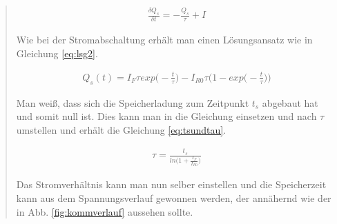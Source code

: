 \begin{quote}
	\begin{equation}
         \begin{split}
            \frac{\delta Q_{s}}{\delta t}=-\frac{Q_{s}}{\tau}+I
             \end{split}
         \label{eq:bilanzzeit}
    \end{equation}
    
    Wie bei der Stromabschaltung erhält man einen Lösungsansatz wie in Gleichung
    \ref{eq:lsg2}.
	
	\begin{equation}
         \begin{split}
             Q_{s}(t)=I_{F}\tau exp\Big(-\frac{t}{\tau}\Big)-I_{R0}\tau\Big(1-exp\Big(-\frac{t}{\tau}\Big)\Big)
             \end{split}
         \label{eq:lsg2}
    \end{equation}
	
	Man weiß, dass sich die Speicherladung zum Zeitpunkt $t_s$ abgebaut hat und 
	somit null ist. Dies kann man in die Gleichung einsetzen und nach $\tau$
    umstellen und erhält die Gleichung \ref{eq:tsundtau}. 
    
	\begin{equation}
         \begin{split}
             \tau= \frac{t_s}{ln\Big(1+\frac{I_F}{I_{R0}}\Big)}
             \end{split}
         \label{eq:tsundtau}
    \end{equation}
    
    Das Stromverhältnis kann man nun selber einstellen und die Speicherzeit kann 
    aus dem Spannungsverlauf gewonnen werden, der annähernd wie der in Abb. 
    \ref{fig:kommverlauf} aussehen sollte.
	
	\vspace{2em}
	

\end{quote}
